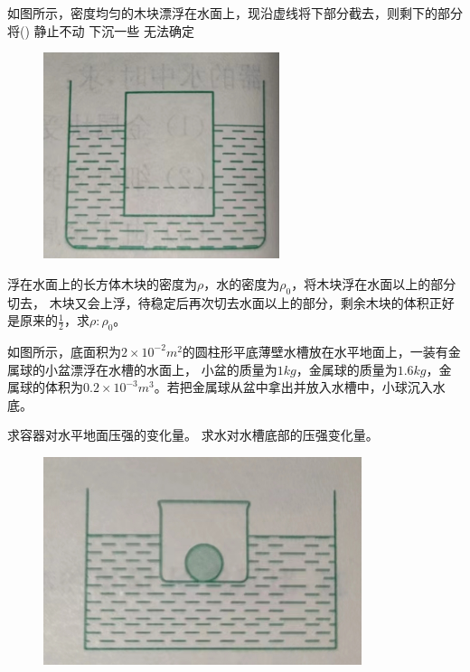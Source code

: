 \documentclass[a4paper,cs4size]{BHCexam}
\begin{document}
\begin{groups}
\begin{questions}[]
        \question[5] 如图所示，密度均匀的木块漂浮在水面上，现沿虚线将下部分截去，则剩下的部分将(\quad\quad\quad\quad)
        {静止不动}
        {下沉一些}
        {无法确定}
        \begin{figure}[htb]
            \flushright
            \includegraphics [scale=0.6,trim=0 0 0 0]{./image/pyhsics_buoyantforce_6.png}
            \label{fig:fig_buoyantforce_6.png}
        \end{figure}
        \vspace{0.5cm}


        \question[5] 浮在水面上的长方体木块的密度为$\rho$，水的密度为$\rho_0$，将木块浮在水面以上的部分切去，
        木块又会上浮，待稳定后再次切去水面以上的部分，剩余木块的体积正好是原来的$\frac{1}{2}$，求$\rho:\rho_0$。
        \vspace{5cm}

        \question[5] 如图所示，底面积为$2\times 10^{-2}m^2$的圆柱形平底薄壁水槽放在水平地面上，一装有金属球的小盆漂浮在水槽的水面上，
        小盆的质量为$1kg$，金属球的质量为$1.6kg$，金属球的体积为$0.2\times 10^{-3}m^3$。若把金属球从盆中拿出并放入水槽中，小球沉入水底。
        \begin{subquestions}
            \subquestion 求容器对水平地面压强的变化量。
            \subquestion 求水对水槽底部的压强变化量。
        \end{subquestions}
        \begin{figure}[htb]
            \flushright
            \includegraphics [scale=0.5,trim=0 0 0 0]{./image/pyhsics_buoyantforce_7.png}
            \label{fig:fig_buoyantforce_7.png}
        \end{figure}
        \vspace{6cm}


\end{questions}
\end{groups}
\end{document}
